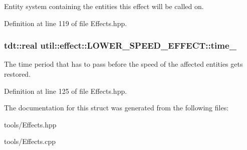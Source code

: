 Entity system containing the entities this effect will be called on. 



Definition at line 119 of file Effects.\+hpp.

\subsubsection[{\texorpdfstring{time\+\_\+}{time_}}]{\setlength{\rightskip}{0pt plus 5cm}tdt\+::real util\+::effect\+::\+L\+O\+W\+E\+R\+\_\+\+S\+P\+E\+E\+D\+\_\+\+E\+F\+F\+E\+C\+T\+::time\+\_\+\hspace{0.3cm}{\ttfamily [private]}}\hypertarget{structutil_1_1effect_1_1_l_o_w_e_r___s_p_e_e_d___e_f_f_e_c_t_a1de62813271d93d454f2fa3faba8ebdc}{}\label{structutil_1_1effect_1_1_l_o_w_e_r___s_p_e_e_d___e_f_f_e_c_t_a1de62813271d93d454f2fa3faba8ebdc}


The time period that has to pass before the speed of the affected entities gets restored. 



Definition at line 125 of file Effects.\+hpp.



The documentation for this struct was generated from the following files\+:\begin{DoxyCompactItemize}
\item 
tools/Effects.\+hpp\item 
tools/Effects.\+cpp\end{DoxyCompactItemize}
